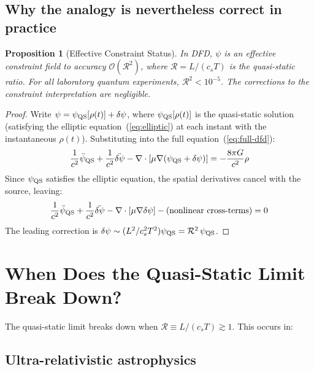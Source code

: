 \documentclass[12pt,a4paper]{article}
\newtheorem{proposition}[theorem]{Proposition}
\newcommand{\order}[1]{\mathcal{O}(#1)}
\begin{document}
\subsection{Why the analogy is nevertheless correct in practice}

\begin{proposition}[Effective Constraint Status]
\label{prop:effective-constraint}
In DFD, $\psi$ is an \emph{effective} constraint field to accuracy
$\order{\mathcal{R}^2}$, where $\mathcal{R} = L/(c_s T)$ is the
quasi-static ratio. For all laboratory quantum experiments,
$\mathcal{R}^2 < 10^{-5}$. The corrections to the constraint
interpretation are negligible.
\end{proposition}

\begin{proof}
Write $\psi = \psi_{\rm QS}[\rho(t)] + \delta\psi$, where
$\psi_{\rm QS}[\rho(t)]$ is the quasi-static solution (satisfying the
elliptic equation~(\ref{eq:elliptic}) at each instant with the
instantaneous $\rho(t)$). Substituting into the full
equation~(\ref{eq:full-dfd}):
\begin{equation}
\frac{1}{c^2}\ddot\psi_{\rm QS}
+ \frac{1}{c^2}\ddot{\delta\psi}
- \nabla\cdot[\mu\nabla(\psi_{\rm QS}+\delta\psi)]
= -\frac{8\pi G}{c^2}\rho
\end{equation}
Since $\psi_{\rm QS}$ satisfies the elliptic equation, the spatial
derivatives cancel with the source, leaving:
\begin{equation}
\frac{1}{c^2}\ddot\psi_{\rm QS}
+ \frac{1}{c^2}\ddot{\delta\psi}
- \nabla\cdot[\mu\nabla\delta\psi]
- \text{(nonlinear cross-terms)} = 0
\end{equation}
The leading correction is $\delta\psi \sim (L^2/c_s^2 T^2)\psi_{\rm QS}
= \mathcal{R}^2\,\psi_{\rm QS}$.
\end{proof}


\section{When Does the Quasi-Static Limit Break Down?}
\label{sec:breakdown}

The quasi-static limit breaks down when $\mathcal{R} \equiv L/(c_s T)
\gtrsim 1$. This occurs in:

\subsection{Ultra-relativistic astrophysics}
\end{document}
